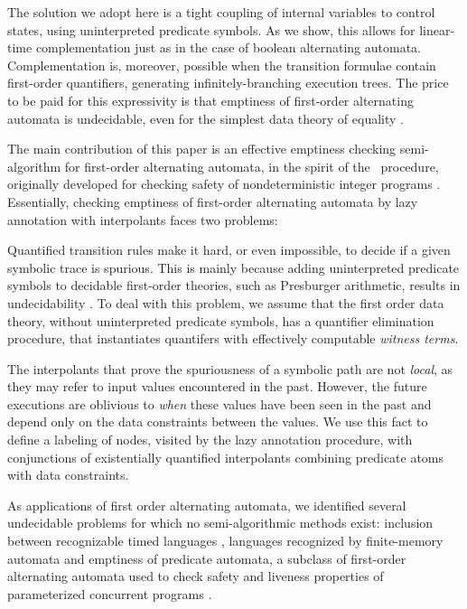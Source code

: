 The solution we adopt here is a tight coupling of internal variables
to control states, using uninterpreted predicate symbols. As we show,
this allows for linear-time complementation just as in the case of
boolean alternating automata. Complementation is, moreover, possible
when the transition formulae contain first-order quantifiers,
generating infinitely-branching execution trees. The price to be paid
for this expressivity is that emptiness of first-order alternating
automata is undecidable, even for the simplest data theory of equality
\cite{Farzan15}.

The main contribution of this paper is an effective emptiness checking
semi-algorithm for first-order alternating automata, in the spirit of
the \impact~procedure, originally developed for checking safety of
nondeterministic integer programs \cite{McMillan06}. Essentially,
checking emptiness of first-order alternating automata by lazy
annotation with interpolants faces two problems: \begin{compactenum}
\item Quantified transition rules make it hard, or even impossible, to
  decide if a given symbolic trace is spurious. This is mainly because
  adding uninterpreted predicate symbols to decidable first-order
  theories, such as Presburger arithmetic, results in undecidability
  \cite{Halpern91}. To deal with this problem, we assume that the
  first order data theory, without uninterpreted predicate symbols,
  has a quantifier elimination procedure, that instantiates quantifers
  with effectively computable \emph{witness terms}.
%
\item The interpolants that prove the spuriousness of a symbolic path
  are not \emph{local}, as they may refer to input values encountered
  in the past. However, the future executions are oblivious to
  \emph{when} these values have been seen in the past and depend only
  on the data constraints between the values. We use this fact to
  define a labeling of nodes, visited by the lazy annotation
  procedure, with conjunctions of existentially quantified
  interpolants combining predicate atoms with data constraints.
\end{compactenum}

As applications of first order alternating automata, we identified
several undecidable problems for which no semi-algorithmic methods
exist: inclusion between recognizable timed languages
\cite{AlurDill94}, languages recognized by finite-memory automata
\cite{KaminskiFrancez94} and emptiness of predicate automata, a
subclass of first-order alternating automata used to check safety and
liveness properties of parameterized concurrent programs
\cite{Farzan15,Farzan16}.

